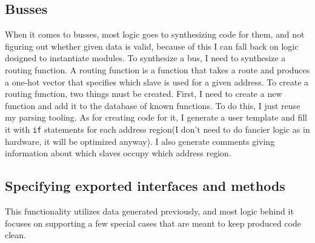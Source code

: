 \documentclass[12pt]{report}
\begin{document}
\subsection{Busses}
When it comes to busses, most logic goes to synthesizing code for them, and not figuring out whether given data is valid, because of this I can fall back on logic designed to instantiate modules. To synthesize a bus, I need to synthesize a routing function.
A routing function is a function that takes a route and produces a one-hot vector that specifies which slave is used for a given address. 
To create a routing function, two things must be created. First, I need to create a new function and add it to the database of known functions. To do this, I just reuse my parsing tooling. As for creating code for it, I generate a user template and fill it with \verb!if! statements for each address region(I don't need to do fancier logic as in hardware, it will be optimized anyway). I also generate comments giving information about which slaves occupy which address region.

\subsection{Specifying exported interfaces and methods}
This functionality utilizes data generated previously, and most logic behind it focuses on supporting a few special cases that are meant to keep produced code clean.
\end{document}
